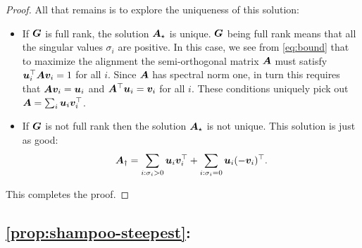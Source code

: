 \begin{proof}
All that remains is to explore the uniqueness of this solution:
\begin{itemize}
    \item If ${\bm{G}}$ is full rank, the solution ${\bm{A}}_\star$ is unique. ${\bm{G}}$ being full rank means that all the singular values $\sigma_i$ are positive. In this case, we see from \cref{eq:bound} that to maximize the alignment the semi-orthogonal matrix ${\bm{A}}$ must satisfy ${\bm{u}}_i^\top {\bm{A}} {\bm{v}}_i =1$ for all $i$. Since ${\bm{A}}$ has spectral norm one, in turn this requires that
${\bm{A}} {\bm{v}}_i = {\bm{u}}_i$ and ${\bm{A}}^\top {\bm{u}}_i = {\bm{v}}_i$ for all $i$. These conditions uniquely pick out ${\bm{A}} = \sum_i {\bm{u}}_i {\bm{v}}_i^\top$.
    \item If ${\bm{G}}$ is not full rank then the solution ${\bm{A}}_\star$ is not unique. This solution is just as good:
    \begin{equation}
        {\bm{A}}_\dagger = \sum_{i:\sigma_i > 0} {\bm{u}}_i {\bm{v}}_i^\top + \sum_{i:\sigma_i = 0}{\bm{u}}_i (-{\bm{v}}_i)^\top.
    \end{equation}
\end{itemize}
This completes the proof.\end{proof}

















\subsection*{\cref{prop:shampoo-steepest}: } \label{proof:shampoo-steepest}

